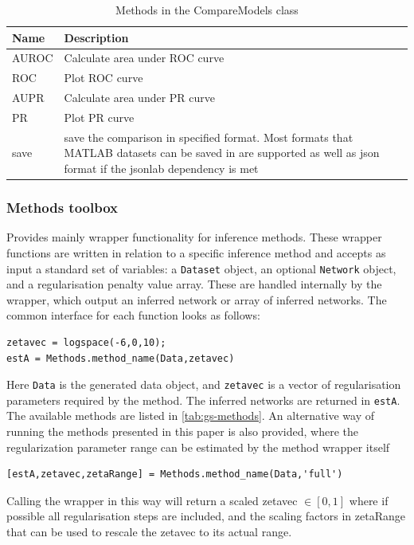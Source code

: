 \begin{bibunit}
\begin{table}[htb]
\caption{\label{tab:compare_functionality}
Methods in the CompareModels class}
\centering
\begin{tabular}{|l|p{8cm}|}
\hline
Name & Description\\
\hline
AUROC & Calculate area under ROC curve\\
ROC & Plot ROC curve\\
AUPR & Calculate area under PR curve\\
PR & Plot PR curve\\
save & save the comparison in specified format. Most formats that MATLAB datasets can be saved in are supported as well as json format if the jsonlab dependency is met\\
\hline
\end{tabular}
\end{table}


\subsubsection{Methods toolbox}
\label{sec:methods_toolbox}
Provides mainly wrapper functionality for inference methods.
These wrapper functions are written in relation to a specific inference method and accepts as
input a standard set of variables: a \texttt{Dataset} object,
an optional \texttt{Network} object, and a regularisation penalty value array.
These are handled internally by the wrapper, which output an inferred network or array of inferred networks.
The common interface for each function looks as follows:
\begin{verbatim}
zetavec = logspace(-6,0,10);
estA = Methods.method_name(Data,zetavec)
\end{verbatim}
Here \texttt{Data} is the generated data object, and \texttt{zetavec} is a vector of regularisation parameters required by the method.
The inferred networks are returned in \texttt{estA}.
The available methods are listed in \ref{tab:gs-methods}.
An alternative way of running the methods presented in this paper is also provided, where the regularization parameter range can be estimated by the method wrapper itself
\begin{verbatim}
[estA,zetavec,zetaRange] = Methods.method_name(Data,'full')
\end{verbatim}
Calling the wrapper in this way will return a scaled zetavec $\in [0,1]$ where if possible all regularisation steps are included, and the scaling factors in zetaRange that can be used to rescale the zetavec to its actual range.


\end{bibunit}
